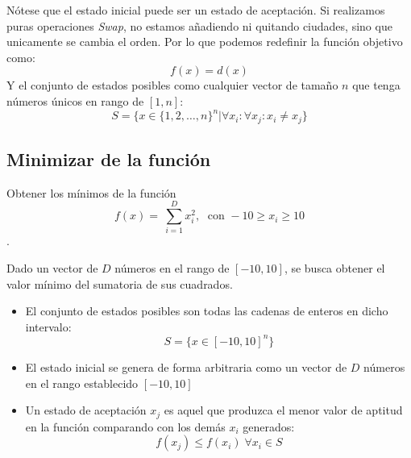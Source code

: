 \documentclass[12pt,twoside]{article}
\begin{document}
	Nótese que el estado inicial puede ser un estado de aceptación. Si realizamos puras operaciones \textit{Swap}, no estamos añadiendo ni quitando ciudades, sino que unicamente se cambia el orden. Por lo que podemos redefinir la función objetivo como: \[ f(x) = d(x) \] Y el conjunto de estados posibles como cualquier vector de tamaño $n$ que tenga números únicos en rango de $[1,n]$: \[ S = \{ x \in \{1, 2, \dots, n  \}^n | \forall x_i \colon \forall x_j \colon x_i \neq x_j \}\]
	
	\subsection{Minimizar de la función}
	
	Obtener los mínimos de la función \[ f(x) = \ \sum_{i = 1}^{D} x_i^2, \; \text{ con } -10 \geq x_i \geq 10 \].
	
	Dado un vector de $D$ números en el rango de $[-10, 10]$, se busca obtener el valor mínimo del sumatoria  de sus cuadrados.
	
	\begin{itemize}
		\item El conjunto de estados posibles son todas las cadenas de enteros en dicho intervalo: \[ S = \{ x \in [-10, 10]^n \} \]
		
		\item El estado inicial se genera de forma arbitraria como un vector de $D$ números en el rango establecido $[-10, 10]$
		
		\item Un estado de aceptación $x_j$ es aquel que produzca el menor valor de aptitud en la función comparando con los demás $x_i$ generados: \[ f(x_j) \leq f(x_i) \; \forall x_i \in S\] 
	\end{itemize}
\end{document}
